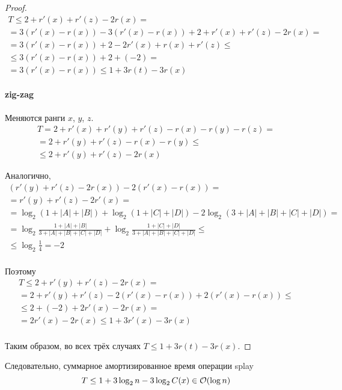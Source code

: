 \begin{proof}
    \begin{gather*}
        T \le 2 + r'(x) + r'(z) - 2r(x) = \\
        = 3 (r'(x) - r(x)) - 3 (r'(x) - r(x)) + 2 + r'(x) + r'(z) - 2r(x) = \\
        = 3 (r'(x) - r(x)) + 2 - 2 r'(x) + r(x) + r'(z) \le \\
        \le 3 (r'(x) - r(x)) + 2 + (-2) = \\
        = 3 (r'(x) - r(x)) \le 1 + 3 r(t) - 3 r(x)
    \end{gather*}

    \paragraph{zig-zag}
    Меняются ранги $x$, $y$, $z$.
    \begin{gather*}
        T = 2 + r'(x) + r'(y) + r'(z) - r(x) - r(y) - r(z) = \\
        = 2 + r'(y) + r'(z) - r(x) - r(y) \le \\
        \le 2 + r'(y) + r'(z) - 2 r(x)
    \end{gather*}

    Аналогично,
    \begin{gather*}
        (r'(y) + r'(z) - 2 r(x)) - 2 (r'(x) - r(x)) = \\
        = r'(y) + r'(z) - 2 r'(x) = \\
        = \log_2 (1 + |A| + |B|) + \log_2 (1 + |C| + |D|)
        - 2 \log_2 (3 + |A| + |B| + |C| + |D|) = \\
        = \log_2 \frac{1 + |A| + |B|}{3 + |A| + |B| + |C| + |D|}
        + \log_2 \frac{1 + |C| + |D|}{3 + |A| + |B| + |C| + |D|} \le \\
        \le \log_2 \frac{1}{4} = -2 \\
    \end{gather*}

    Поэтому
    \begin{gather*}
        T \le 2 + r'(y) + r'(z) - 2 r(x) = \\
        = 2 + r'(y) + r'(z) - 2 (r'(x) - r(x)) + 2 (r'(x) - r(x)) \le \\
        \le 2 + (-2) + 2 r'(x) - 2 r(x) = \\
        = 2 r'(x) - 2 r(x) \le 1 + 3 r'(x) - 3 r(x) \\
    \end{gather*}

    Таким образом, во всех трёх случаях
    $T \le 1 + 3 r(t) - 3 r(x)$.
\end{proof}

Следовательно, суммарное амортизированное время операции splay
\[ T \le 1 + 3 \log_2 n - 3 \log_2 C(x) \in \mathcal{O}(\log n) \]
